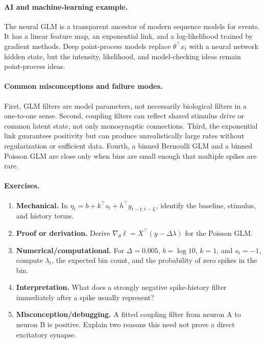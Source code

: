 \paragraph{AI and machine-learning example.}
The neural GLM is a transparent ancestor of modern sequence models for events. It has a linear feature map, an exponential link, and a log-likelihood trained by gradient methods. Deep point-process models replace \(\theta^\top x_t\) with a neural network hidden state, but the intensity, likelihood, and model-checking ideas remain point-process ideas.

\paragraph{Common misconceptions and failure modes.}
First, GLM filters are model parameters, not necessarily biological filters in a one-to-one sense. Second, coupling filters can reflect shared stimulus drive or common latent state, not only monosynaptic connections. Third, the exponential link guarantees positivity but can produce unrealistically large rates without regularization or sufficient data. Fourth, a binned Bernoulli GLM and a binned Poisson GLM are close only when bins are small enough that multiple spikes are rare.

\paragraph{Exercises.}
\begin{enumerate}[label=\textbf{46.3.\arabic*.}, leftmargin=*]
\item \textbf{Mechanical.} In \(\eta_t=b+k^\top s_t+h^\top y_{t-1:t-L}\), identify the baseline, stimulus, and history terms.
\item \textbf{Proof or derivation.} Derive \(\nabla_\theta\ell=X^\top(y-\Delta\lambda)\) for the Poisson GLM.
\item \textbf{Numerical/computational.} For \(\Delta=0.005\), \(b=\log 10\), \(k=1\), and \(s_t=-1\), compute \(\lambda_t\), the expected bin count, and the probability of zero spikes in the bin.
\item \textbf{Interpretation.} What does a strongly negative spike-history filter immediately after a spike usually represent?
\item \textbf{Misconception/debugging.} A fitted coupling filter from neuron A to neuron B is positive. Explain two reasons this need not prove a direct excitatory synapse.
\end{enumerate}


